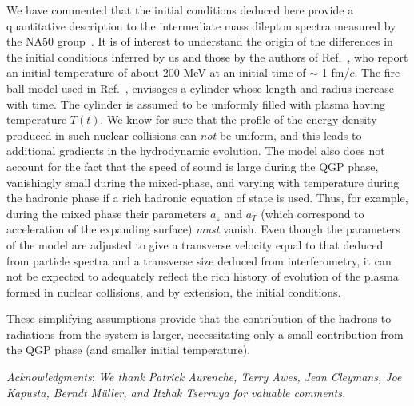 We have commented that the initial conditions deduced here provide
a quantitative description to the intermediate mass dilepton spectra
measured by the NA50 group~\cite{had_dil}. It is of interest to understand 
the origin of the differences in the initial conditions inferred by us
and those by the authors of Ref.~\cite{rapp}, who report an initial
temperature of about 200 MeV at an initial time of $\sim$ 1 fm/$c$.
 The fire-ball model used
in  Ref.~\cite{rapp}, envisages a cylinder  whose length and radius 
increase with time. The cylinder is assumed to be uniformly filled with
 plasma having temperature $T(t)$. We know for sure that the profile of the
energy density produced in such nuclear collisions can  {\em not} be uniform,
and this leads to additional gradients in the hydrodynamic evolution.
The model also does not account for the fact that the speed of sound is
large during the QGP phase, vanishingly small during the mixed-phase,
and varying with temperature during the hadronic phase if a rich 
hadronic equation of state is used. Thus, for example, during the mixed
phase their parameters $a_z$ and $a_T$ (which correspond to 
acceleration of the expanding surface) {\em must} vanish. 
 Even though the parameters of the model are
adjusted to give a transverse velocity equal to that deduced from
particle spectra and a transverse size deduced from interferometry, it
can not be expected to adequately reflect the rich history of evolution
of the plasma formed in nuclear collisions, and by 
extension, the initial conditions. 

These simplifying assumptions provide that the contribution of the
 hadrons to radiations from the system is larger, necessitating
only a small contribution from the QGP phase (and smaller initial temperature).


{\em  {Acknowledgments}}: 
{\sl We thank Patrick Aurenche, Terry Awes, Jean Cleymans, Joe Kapusta,  
Berndt M\"{u}ller, and Itzhak Tserruya for valuable comments.}


